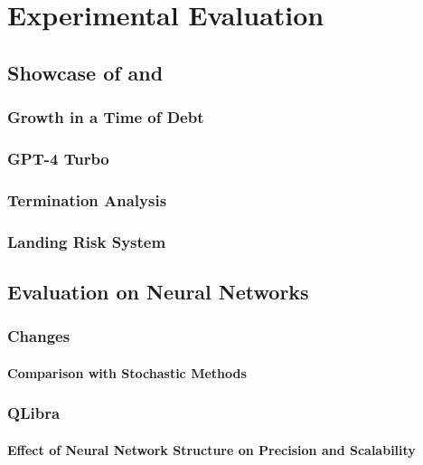 \chapter{Experimental Evaluation}

\section{Showcase of \outcomesname{} and \rangename{}}

\subsection{Growth in a Time of Debt}

\subsection{GPT-4 Turbo}

\subsection{Termination Analysis}

\subsection{Landing Risk System}

\section{Evaluation on Neural Networks}

\subsection{Changes}

\subsubsection{Comparison with Stochastic Methods}

\subsection{QLibra}

\subsubsection{Effect of Neural Network Structure on Precision and Scalability}

